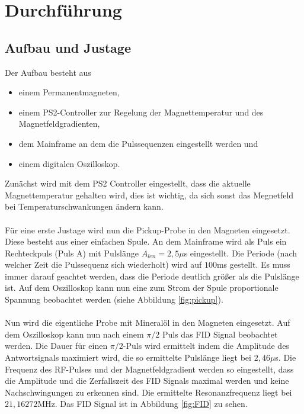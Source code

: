 \section{Durchführung}
\subsection{Aufbau und Justage}
Der Aufbau besteht aus 

\begin{itemize}
  \item einem Permanentmagneten,
    \item einem PS2-Controller zur Regelung der Magnettemperatur und des Magnetfeldgradienten,
      \item dem Mainframe an dem die Pulssequenzen eingestellt werden und
        \item einem digitalen Oszilloskop.
\end{itemize}

Zunächst wird mit dem PS2 Controller eingestellt, dass die aktuelle Magnettemperatur gehalten wird, dies ist wichtig, da sich sonst das Megnetfeld bei Temperaturschwankungen ändern kann. \\ \\
Für eine erste Justage wird nun die Pickup-Probe in den Magneten eingesetzt. Diese besteht aus einer einfachen Spule. An dem Mainframe wird als Puls ein Rechteckpuls (Puls A) mit Pulslänge $A_{len}=2,5\mu$s eingestellt. Die Periode (nach welcher Zeit die Pulssequenz sich wiederholt) wird auf $100$ms gestellt. Es muss immer darauf geachtet werden, dass die Periode deutlich größer als die Pulslänge ist. Auf dem Oszilloskop kann nun eine zum Strom der Spule proportionale Spannung beobachtet werden (siehe Abbildung \ref{fig:pickup}).\\ \\
Nun wird die eigentliche Probe mit Mineralöl in den Magneten eingesetzt. Auf dem Oszilloskop kann nun nach einem $\pi/2$ Puls das FID Signal beobachtet werden. Die Dauer für einen $\pi/2$-Puls wird ermittelt indem die Amplitude des Antwortsignals maximiert wird, die so ermittelte Pulslänge liegt bei $2,46 \mu$s. Die Frequenz des RF-Pulses und der Magnetfeldgradient werden so eingestellt, dass die Amplitude und die Zerfallszeit des FID Signals maximal werden und keine Nachschwingungen zu erkennen sind. Die ermittelte Resonanzfrequenz liegt bei $21,16272$MHz. Das FID Signal ist in Abbildung \ref{fig:FID} zu sehen. 

